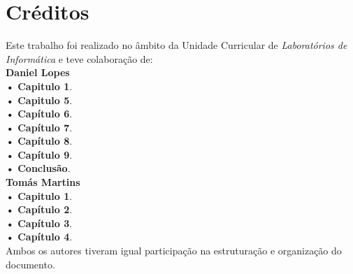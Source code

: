 \chapter{Créditos}

Este trabalho foi realizado no âmbito da Unidade Curricular de \emph{Laboratórios de Informática} e teve colaboração de:\\

\textbf{Daniel Lopes}\\
\textbf{•  }\textbf{Capitulo 1}.\\
\textbf{•  }\textbf{Capitulo 5}.\\
\textbf{•  }\textbf{Capítulo 6}.\\
\textbf{•  }\textbf{Capítulo 7}.\\
\textbf{•  }\textbf{Capítulo 8}.\\
\textbf{•  }\textbf{Capítulo 9}.\\
\textbf{•  }\textbf{Conclusão}.\\


\textbf{Tomás Martins}\\

\textbf{•  }\textbf{Capitulo 1}.\\
\textbf{•  }\textbf{Capítulo 2}.\\
\textbf{•  }\textbf{Capítulo 3}.\\
\textbf{•  }\textbf{Capítulo 4}.\\


Ambos os autores tiveram igual participação na estruturação e organização do documento.
